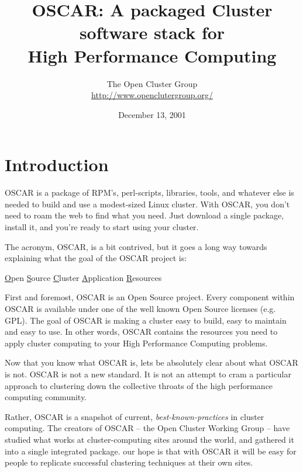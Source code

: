 \documentclass[letterpaper,11pt]{article}
\begin{document}
\title{OSCAR: A packaged Cluster software stack for \\
       High Performance Computing} 
\author{The Open Cluster Group \\
\url{http://www.openclutergroup.org/}}

\date{December 13, 2001}

\maketitle



\section{Introduction}
OSCAR is a package of RPM's, perl-scripts, libraries, tools, and
whatever else is needed to build and use a modest-sized Linux cluster.
With OSCAR, you don't need to roam the web to find what you need.
Just download a single package, install it, and you're ready to start
using your cluster.

The acronym, OSCAR, is a bit contrived, but it goes a long way towards
explaining what the goal of the OSCAR project is: 
\begin{center}
 \underline{O}pen \underline{S}ource \underline{C}luster 
 \underline{A}pplication \underline{R}esources
\end{center}

First and foremost, OSCAR is an Open Source project.  Every component
within OSCAR is available under one of the well known Open Source
licenses (e.g. GPL).  The goal of OSCAR is making a cluster easy to
build, easy to maintain and easy to use.  In other words, OSCAR
contains the resources you need to apply cluster computing to your
High Performance Computing problems.

Now that you know what OSCAR is, lets be absolutely clear about what
OSCAR is not.  OSCAR is not a new standard.  It is not an attempt to
cram a particular approach to clustering down the collective throats
of the high performance computing community.

Rather, OSCAR is a snapshot of current, \emph{best-known-practices} in
cluster computing.  The creators of OSCAR -- the Open Cluster Working
Group -- have studied what works at cluster-computing sites around the
world, and gathered it into a single integrated package.  our hope is
that with OSCAR it will be easy for people to replicate successful
clustering techniques at their own sites.
\end{document}
